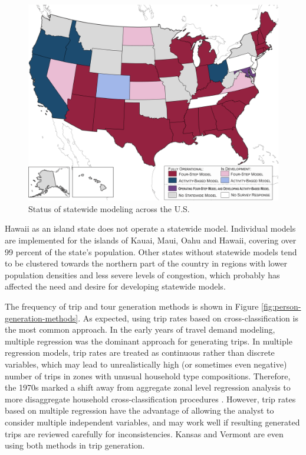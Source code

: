 \begin{figure}   %
\centering
\includegraphics[width=6.5in]{graphics/06-statewide-modeling-status}
\caption{Status of statewide modeling across the U.S.}
\label{fig:statewide-modeling-status}
\end{figure}

Hawaii as an island state does not operate a statewide model. Individual models are implemented for the islands of Kauai, Maui, Oahu and Hawaii, covering over 99 percent of the state's population. Other states without statewide models tend to be clustered towards the northern part of the country in regions with lower population densities and less severe levels of congestion, which probably has affected the need and desire for developing statewide models.

The frequency of trip and tour generation methods is shown in Figure \ref{fig:person-generation-methods}. As expected, using trip rates based on cross-classification is the most common approach. In the early years of travel demand modeling, multiple regression was the dominant approach for generating trips. In multiple regression models, trip rates are treated as continuous rather than discrete variables, which may lead to unrealistically high (or sometimes even negative) number of trips in zones with unusual household type compositions. Therefore, the 1970s marked a shift away from aggregate zonal level regression analysis to more disaggregate household cross-classification procedures \citep{ortuzar11}. However, trip rates based on multiple regression have the advantage of allowing the analyst to consider multiple independent variables, and may work well if resulting generated trips are reviewed carefully for inconsistencies. Kansas and Vermont are even using both methods in trip generation.

